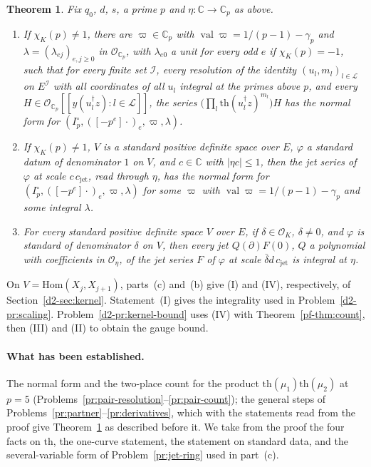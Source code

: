 \documentclass[reqno]{amsart}
\theoremstyle{plain}
\newtheorem{theorem}{Theorem}[section]
\theoremstyle{definition}
\theoremstyle{remark}
\newcommand{\C}{\mathbb{C}}
\newcommand{\Oc}{\mathcal{O}}
\newcommand{\Op}{\mathcal{O}_{\C_p}}
\newcommand{\val}{\operatorname{val}}
\newcommand{\tth}{\mathrm{th}}
\newcommand{\cjet}{c_{\mathrm{jet}}}
\begin{document}
\begin{theorem}\label{thm:normal-form}
Fix \(q_0\), \(d\), \(s\), a prime \(p\) and \(\eta\colon \C \to \C_p\) as above.
\begin{enumerate}
\item[(a)] If \(\chi_K(p) \ne 1\), there are \(\varpi \in \C_p\) with \(\val\varpi = 1/(p-1) - \gamma_p\) and \(\lambda = (\lambda_{ej})_{e,j \ge 0}\) in \(\Op\), with \(\lambda_{e0}\) a unit for every odd \(e\) if \(\chi_K(p) = -1\), such that for every finite set \(\mathcal I\), every resolution of the identity \((u_l, m_l)_{l \in \mathcal L}\) on \(E^{\mathcal I}\) with all coordinates of all \(u_l\) integral at the primes above \(p\), and every \(H \in \Op[[y(u_l^\dagger z) : l \in \mathcal L]]\), the series \(\bigl(\prod_{l} \tth(u_l^\dagger z)^{m_l}\bigr) H\) has the normal form for \((I_p^\circ, ([-p^e]\cdot)_e, \varpi, \lambda)\).
\item[(b)] If \(\chi_K(p) \ne 1\), \(V\) is a standard positive definite space over \(E\), \(\varphi\) a standard datum of denominator \(1\) on \(V\), and \(c \in \C\) with \(\lvert\eta c\rvert \le 1\), then the jet series of \(\varphi\) at scale \(c\,\cjet\), read through \(\eta\), has the normal form for \((I_p^\circ, ([-p^e]\cdot)_e, \varpi, \lambda)\) for some \(\varpi\) with \(\val\varpi = 1/(p-1) - \gamma_p\) and some integral \(\lambda\).
\item[(c)] For every standard positive definite space \(V\) over \(E\), if \(\delta \in \Oc_K\), \(\delta \ne 0\), and \(\varphi\) is standard of denominator \(\delta\) on \(V\), then every jet \(Q(\partial)F(0)\), \(Q\) a polynomial with coefficients in \(\Oc_\eta\), of the jet series \(F\) of \(\varphi\) at scale \(\bar\delta d\,\cjet\) is integral at \(\eta\).
\end{enumerate}
\end{theorem}

On \(V = \mathrm{Hom}(X_j, X_{j+1})\), parts~(c) and~(b) give (I) and (IV), respectively, of Section~\ref{d2-sec:kernel}.  Statement~(I) gives the integrality used in Problem~\ref{d2-pr:scaling}.  Problem~\ref{d2-pr:kernel-bound} uses (IV) with Theorem~\ref{pf-thm:count}, then (III) and (II) to obtain the gauge bound.

\paragraph{What has been established.}  The normal form and the two-place count for the product \(\tth(\mu_1)\tth(\mu_2)\) at \(p = 5\) (Problems~\ref{pr:pair-resolution}--\ref{pr:pair-count}); the general steps of Problems~\ref{pr:partner}--\ref{pr:derivatives}, which with the statements read from the proof give Theorem~\ref{thm:normal-form} as described before it.  We take from the proof \cite{GL} the four facts on \(\tth\), the one-curve statement, the statement on standard data, and the several-variable form of Problem~\ref{pr:jet-ring} used in part~(c).
\end{document}
